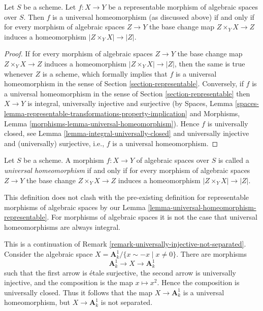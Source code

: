 \begin{lemma}
\label{lemma-universal-homeomorphism-representable}
Let $S$ be a scheme.
Let $f : X \to Y$ be a representable morphism of algebraic spaces over $S$.
Then $f$ is a universal homeomorphism (as discussed above) if and only
if for every morphism of algebraic spaces $Z \to Y$ the base change
map $Z \times_Y X \to Z$ induces a homeomorphism
$|Z \times_Y X| \to |Z|$.
\end{lemma}

\begin{proof}
If for every morphism of algebraic spaces $Z \to Y$ the base change
map $Z \times_Y X \to Z$ induces a homeomorphism
$|Z \times_Y X| \to |Z|$, then the same is true whenever $Z$ is a scheme,
which formally implies that $f$ is a universal homeomorphism in the
sense of
Section \ref{section-representable}.
Conversely, if $f$ is a universal homeomorphism in the sense of
Section \ref{section-representable}
then $X \to Y$ is integral, universally injective and surjective
(by Spaces, Lemma
\ref{spaces-lemma-representable-transformations-property-implication}
and
Morphisms, Lemma \ref{morphisms-lemma-universal-homeomorphism}).
Hence $f$ is universally closed, see
Lemma \ref{lemma-integral-universally-closed}
and universally injective and (universally) surjective, i.e.,
$f$ is a universal homeomorphism.
\end{proof}

\begin{definition}
\label{definition-universal-homeomorphism}
Let $S$ be a scheme.
A morphism $f : X \to Y$ of algebraic spaces over $S$
is called a {\it universal homeomorphism}
if and only if for every morphism of algebraic spaces $Z \to Y$
the base change $Z \times_Y X \to Z$ induces a homeomorphism
$|Z \times_Y X| \to |Z|$.
\end{definition}

\noindent
This definition does not clash with the pre-existing definition for
representable morphisms of algebraic spaces by our
Lemma \ref{lemma-universal-homeomorphism-representable}.
For morphisms of algebraic spaces it is not the case that universal
homeomorphisms are always integral.

\begin{example}
\label{example-universal-homeomorphism}
This is a continuation of
Remark \ref{remark-universally-injective-not-separated}.
Consider the algebraic space
$X = \mathbf{A}^1_k/\{x \sim -x \mid x \not = 0\}$.
There are morphisms
$$
\mathbf{A}^1_k \longrightarrow X \longrightarrow \mathbf{A}^1_k
$$
such that the first arrow is \'etale surjective, the second arrow is
universally injective, and the composition is the map $x \mapsto x^2$.
Hence the composition is universally closed. Thus it follows that the
map $X \to \mathbf{A}^1_k$ is a universal homeomorphism, but
$X \to \mathbf{A}^1_k$ is not separated.
\end{example}

